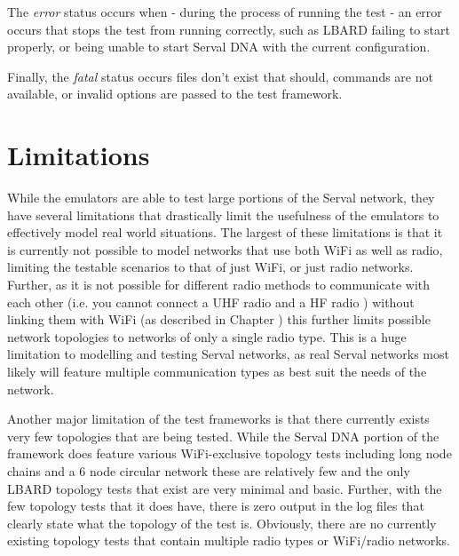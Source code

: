 The \emph{error} status occurs when - during the process of running the test - an error occurs that stops the test from running correctly, such as LBARD failing to start properly, or being unable to start Serval DNA with the current configuration.

Finally, the \emph{fatal} status occurs files don't exist that should, commands are not available, or invalid options are passed to the test framework.



\section{Limitations}
While the emulators are able to test large portions of the Serval network, they have several limitations that drastically limit the usefulness of the emulators to effectively model real world situations.
The largest of these limitations is that it is currently not possible to model networks that use both WiFi as well as radio, limiting the testable scenarios to that of just WiFi, or just radio networks.
Further, as it is not possible for different radio methods to communicate with each other (i.e. you cannot connect a UHF radio and a HF radio ) without linking them with WiFi (as described in Chapter ) this further limits possible network topologies to networks of only a single radio type.
This is a huge limitation to modelling and testing Serval networks, as real Serval networks most likely will feature multiple communication types as best suit the needs of the network.

Another major limitation of the test frameworks is that there currently exists very few topologies that are being tested.
While the Serval DNA portion of the framework does feature various WiFi-exclusive topology tests including long node chains and a 6 node circular network these are relatively few and the only LBARD topology tests that exist are very minimal and basic.
Further, with the few topology tests that it does have, there is zero output in the log files that clearly state what the topology of the test is. 
Obviously, there are no currently existing topology tests that contain multiple radio types or WiFi/radio networks.

